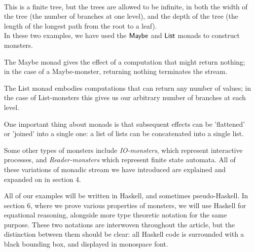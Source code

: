  \\

This is a finite tree, but the trees are allowed to be infinite, in both the width of the tree (the number of branches at one level), and the depth of the tree (the length of the longest path from the root to a leaf). \\

In these two examples, we have used the $\mathsf{Maybe}$ and $\mathsf{List}$ monads to construct monsters. 




The Maybe monad gives the effect of a computation that might return nothing; in the case of a Maybe-monster, returning nothing terminates the stream. 

The List monad embodies computations that can return any number of values; in the case of List-monsters this gives us our arbitrary number of branches at each level.

One important thing about monads is that subsequent effects can be 'flattened' or 'joined' into a single one: a list of lists can be concatenated into a single list. 

Some other types of monsters include \emph{IO-monsters}, which represent interactive processes, and \emph{Reader-monsters} which represent finite state automata. All of these variations of monadic stream we have introduced are explained and expanded on in section 4.

All of our examples will be written in Haskell, and sometimes pseudo-Haskell. In section 6, where we prove various properties of monsters, we will use Haskell for equational reasoning, alongside more type theoretic notation for the same purpose. These two notations are interwoven throughout the article, but the distinction between them should be clear: all Haskell code is surrounded with a black bounding box, and displayed in monospace font. \\


